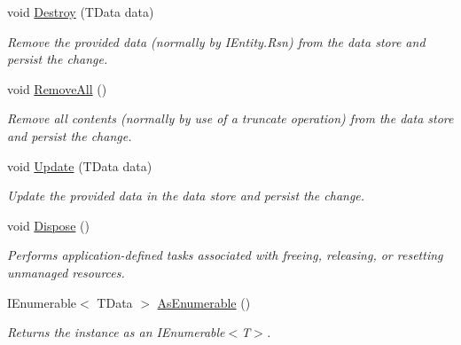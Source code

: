 \begin{DoxyCompactItemize}
void \hyperlink{classCqrs_1_1Azure_1_1DocumentDb_1_1DataStores_1_1AzureDocumentDbDataStore_affe39fe57e590555256258fa6c568c29_affe39fe57e590555256258fa6c568c29}{Destroy} (T\+Data data)
\begin{DoxyCompactList}\small\item\em Remove the provided {\itshape data}  (normally by I\+Entity.\+Rsn) from the data store and persist the change. \end{DoxyCompactList}\item 
void \hyperlink{classCqrs_1_1Azure_1_1DocumentDb_1_1DataStores_1_1AzureDocumentDbDataStore_a0d72cc318e98e01b3dbed86d412a8778_a0d72cc318e98e01b3dbed86d412a8778}{Remove\+All} ()
\begin{DoxyCompactList}\small\item\em Remove all contents (normally by use of a truncate operation) from the data store and persist the change. \end{DoxyCompactList}\item 
void \hyperlink{classCqrs_1_1Azure_1_1DocumentDb_1_1DataStores_1_1AzureDocumentDbDataStore_a55f504ed5094e3041a266b958424b1a2_a55f504ed5094e3041a266b958424b1a2}{Update} (T\+Data data)
\begin{DoxyCompactList}\small\item\em Update the provided {\itshape data}  in the data store and persist the change. \end{DoxyCompactList}\item 
void \hyperlink{classCqrs_1_1Azure_1_1DocumentDb_1_1DataStores_1_1AzureDocumentDbDataStore_ade945ac02451a490711367dbe54d4132_ade945ac02451a490711367dbe54d4132}{Dispose} ()
\begin{DoxyCompactList}\small\item\em Performs application-\/defined tasks associated with freeing, releasing, or resetting unmanaged resources. \end{DoxyCompactList}\item 
I\+Enumerable$<$ T\+Data $>$ \hyperlink{classCqrs_1_1Azure_1_1DocumentDb_1_1DataStores_1_1AzureDocumentDbDataStore_acbe24a7d0def44ca4826bbf5658a6054_acbe24a7d0def44ca4826bbf5658a6054}{As\+Enumerable} ()
\begin{DoxyCompactList}\small\item\em Returns the instance as an I\+Enumerable$<$\+T$>$. \end{DoxyCompactList}\end{DoxyCompactItemize}
